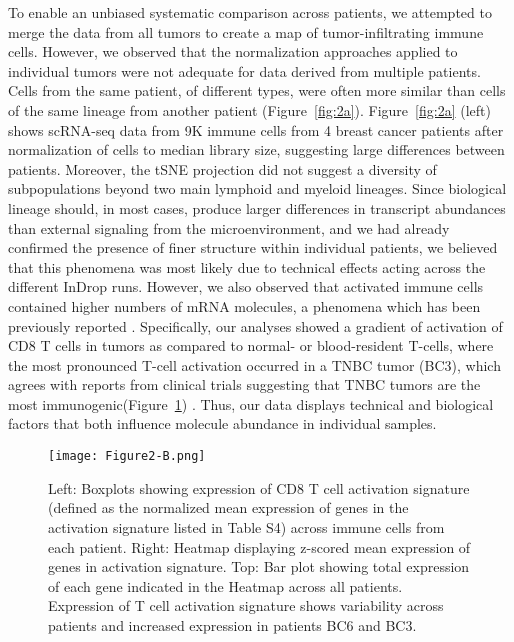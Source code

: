 To enable an unbiased systematic comparison across patients, we attempted to merge the data from all tumors to create a map of tumor-infiltrating immune cells. 
However, we observed that the normalization approaches applied to individual tumors were not adequate for data derived from multiple patients. 
Cells from the same patient, of different types, were often more similar than cells of the same lineage from another patient (Figure~\ref{fig:2a}). 
Figure~\ref{fig:2a} (left) shows scRNA-seq data from 9K immune cells from 4 breast cancer patients after normalization of cells to median library size, suggesting large differences between patients.
Moreover, the tSNE projection did not suggest a diversity of subpopulations beyond two main lymphoid and myeloid lineages. 
Since biological lineage should, in most cases, produce larger differences in transcript abundances than external signaling from the microenvironment, and we had already confirmed the presence of finer structure within individual patients, we believed that this phenomena was most likely due to technical effects acting across the different InDrop runs.
However, we also observed that activated immune cells contained higher numbers of mRNA molecules, a phenomena which has been previously reported \citep{Blackinton2016,Cheadle2005,Marrack2000,Singer2016}. 
Specifically, our analyses showed a gradient of activation of CD8 T cells in tumors as compared to normal- or blood-resident T-cells, where the most pronounced T-cell activation occurred in a TNBC tumor (BC3), which agrees with reports from clinical trials suggesting that TNBC tumors are the most immunogenic(Figure~\ref{fig:2b}) \citep{Dushyanthen2015,Garcia-Teijido2016}. 
Thus, our data displays technical and biological factors that both influence molecule abundance in individual samples. 

\begin{figure}
\centering
\texttt{[image: Figure2-B.png]}
\caption{Left: Boxplots showing expression of CD8 T cell activation signature (defined as the normalized mean expression of genes in the activation signature listed in Table S4) across immune cells from each patient. Right: Heatmap displaying z-scored mean expression of genes in activation signature. Top: Bar plot showing total expression of each gene indicated in the Heatmap across all patients. Expression of T cell activation signature shows variability across patients and increased expression in patients BC6 and BC3.} %
\label{fig:2b}
\end{figure}

